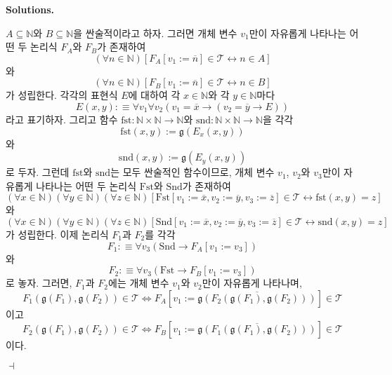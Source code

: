 \documentclass[12pt]{paper}
\newcommand{\gnum}{ \mathfrak{g} }
\newenvironment{context}[1][]{\noindent \textbf{{#1}.}}{\hfill $ \dashv $}
\begin{document}
\begin{context}[Solutions]
\begin{enumerate}
      $A \subseteq \mathbb{N}$와 $B \subseteq \mathbb{N}$을 싼술적이라고 하자.
      그러면 개체 변수 $v_1$만이 자유롭게 나타나는 어떤 두 논리식 $F_A$와 $F_B$가 존재하여
      $$ \left( \forall n \in \mathbb{N} \right) \left[ F_A \left[ v_1 := \overline{n} \right] \in \mathcal{T} \leftrightarrow n \in A \right]$$와
      $$ \left( \forall n \in \mathbb{N} \right) \left[ F_B \left[ v_1 := \overline{n} \right] \in \mathcal{T} \leftrightarrow n \in B \right]$$가 성립한다.
      각각의 표현식 $E$에 대하여 각 $x \in \mathbb{N}$와 각 $y \in \mathbb{N}$마다 $$E \left( x , y \right) : \equiv \forall v_1 \forall v_2 \left( v_1 = \overline{x} \rightarrow \left( v_2 = \overline{y} \rightarrow E \right) \right)$$라고 표기하자.
      그리고 함수 $\mathrm{fst} : \mathbb{N} \times \mathbb{N} \to \mathbb{N}$와 $\mathrm{snd} : \mathbb{N} \times \mathbb{N} \to \mathbb{N}$을
      각각 $$ \mathrm{fst} \left( x , y \right) := \gnum \left( E_x \left( x , y \right) \right)$$와
      $$\mathrm{snd} \left( x , y \right) := \gnum \left( E_y \left( x , y \right) \right)$$로 두자.
      그런데 $\mathrm{fst}$와 $\mathrm{snd}$는 모두 싼술적인 함수이므로,
      개체 변수 $v_1$, $v_2$와 $v_3$만이 자유롭게 나타나는 어떤 두 논리식 $\mathrm{Fst}$와 $\mathrm{Snd}$가 존재하여
      $$ \left( \forall x \in \mathbb{N} \right) \left( \forall y \in \mathbb{N} \right) \left( \forall z \in \mathbb{N} \right) \left[ \mathrm{Fst} \left[ v_1 := \overline{x} , v_2 := \overline{y} , v_3 := \overline{z} \right] \in \mathcal{T} \leftrightarrow \mathrm{fst} \left( x , y \right) = z \right] $$와
      $$ \left( \forall x \in \mathbb{N} \right) \left( \forall y \in \mathbb{N} \right) \left( \forall z \in \mathbb{N} \right) \left[ \mathrm{Snd} \left[ v_1 := \overline{x} , v_2 := \overline{y} , v_3 := \overline{z} \right] \in \mathcal{T} \leftrightarrow \mathrm{snd} \left( x , y \right) = z \right] $$가 성립한다.
      이제 논리식 $F_1$과 $F_2$를 각각 $$F_1 : \equiv \forall v_3 \left( \mathrm{Snd} \rightarrow F_A \left[ v_1 := v_3 \right] \right)$$와 $$F_2 : \equiv \forall v_3 \left( \mathrm{Fst} \rightarrow F_B \left[ v_1 := v_3 \right] \right)$$로 놓자.
      그러면, $F_1$과 $F_2$에는 개체 변수 $v_1$와 $v_2$만이 자유롭게 나타나며, $$F_1 \left( \gnum \left( F_1 \right) , \gnum \left( F_2 \right) \right) \in \mathcal{T} \iff F_A \left[ v_1 := \overline{\gnum \left( F_2 \left( \gnum \left( F_1 \right) , \gnum \left( F_2 \right) \right) \right)} \right] \in \mathcal{T}$$이고
      $$F_2 \left( \gnum \left( F_1 \right) , \gnum \left( F_2 \right) \right) \in \mathcal{T} \iff F_B \left[ v_1 := \overline{\gnum \left( F_1 \left( \gnum \left( F_1 \right) , \gnum \left( F_2 \right) \right) \right)} \right] \in \mathcal{T}$$이다.

\end{enumerate}
\end{context}
\end{document}

